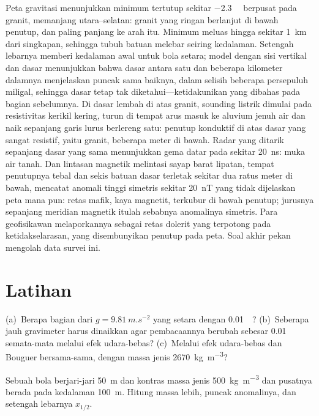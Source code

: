 \begin{example}\label{ex:b3:field-lab-methods-3:varden}
Peta gravitasi menunjukkan minimum tertutup sekitar \qty{-2.3}{\milli\gal}
berpusat pada granit, memanjang utara--selatan: granit yang ringan
berlanjut di bawah penutup, dan paling panjang ke arah itu. Minimum
meluas hingga sekitar \qty{1}{km} dari singkapan, sehingga tubuh batuan melebar
seiring kedalaman. Setengah lebarnya memberi kedalaman awal untuk bola setara;
model dengan sisi vertikal dan dasar menunjukkan bahwa dasar antara satu
dan beberapa kilometer dalamnya menjelaskan puncak sama baiknya, dalam selisih beberapa
persepuluh miligal, sehingga dasar tetap tak diketahui---ketidakunikan
yang dibahas pada bagian sebelumnya. Di dasar lembah di atas granit,
sounding listrik dimulai pada resistivitas kerikil kering, turun di tempat
arus masuk ke aluvium jenuh air dan naik sepanjang garis lurus
berlereng satu: penutup konduktif di atas dasar yang sangat resistif, yaitu
granit, beberapa meter di bawah. Radar yang ditarik sepanjang dasar yang sama menunjukkan
gema datar pada sekitar \qty{20}{ns}: muka air tanah. Dan lintasan magnetik
melintasi sayap barat lipatan, tempat penutupnya tebal dan
sekis batuan dasar terletak sekitar dua ratus meter di bawah, mencatat
anomali tinggi simetris sekitar \qty{20}{nT} yang tidak dijelaskan peta mana pun: retas mafik,
kaya magnetit, terkubur di bawah penutup; jurusnya sepanjang
meridian magnetik itulah sebabnya anomalinya simetris. Para geofisikawan
melaporkannya sebagai retas dolerit yang terpotong pada ketidakselarasan, yang
disembunyikan penutup pada peta. Soal akhir pekan mengolah data
survei ini.
\end{example}

\section{Latihan}

\begin{exercise}[$\star$]\label{exo:b3:field-lab-methods-3:1}
(a)~Berapa bagian dari $g = \qty{9.81}{m.s^{-2}}$ yang setara dengan \qty{0.01}{\milli\gal}?
(b)~Seberapa jauh gravimeter harus dinaikkan agar pembacaannya
berubah sebesar \qty{0.01}{\milli\gal} semata-mata melalui efek udara-bebas? (c)~Melalui
efek udara-bebas dan Bouguer bersama-sama, dengan massa jenis
\qty{2670}{kg.m^{-3}}?
\end{exercise}

\begin{exercise}[$\star$]\label{exo:b3:field-lab-methods-3:2}
Sebuah bola berjari-jari \qty{50}{m} dan kontras massa jenis
\qty{+500}{kg.m^{-3}} dan pusatnya berada pada kedalaman \qty{100}{m}. Hitung
massa lebih, puncak anomalinya, dan setengah lebarnya $x_{1/2}$.
\end{exercise}


